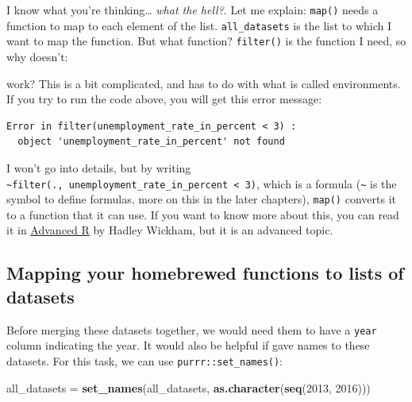 \documentclass[]{gitbook}
\newenvironment{Shaded}{\begin{snugshade}}{\end{snugshade}}
\newcommand{\DecValTok}[1]{\textcolor[rgb]{0.00,0.00,0.81}{#1}}
\newcommand{\KeywordTok}[1]{\textcolor[rgb]{0.13,0.29,0.53}{\textbf{#1}}}
\newcommand{\NormalTok}[1]{#1}
\newcommand{\OperatorTok}[1]{\textcolor[rgb]{0.81,0.36,0.00}{\textbf{#1}}}
\newcommand{\StringTok}[1]{\textcolor[rgb]{0.31,0.60,0.02}{#1}}
\theoremstyle{definition}
\theoremstyle{definition}
\theoremstyle{definition}
\theoremstyle{remark}
\begin{document}
I know what you're thinking\ldots{} \emph{what the hell?}. Let me
explain: \texttt{map()} needs a function to map to each element of the
list. \texttt{all\_datasets} is the list to which I want to map the
function. But what function? \texttt{filter()} is the function I need,
so why doesn't:

\begin{Shaded}
\end{Shaded}

work? This is a bit complicated, and has to do with what is called
environments. If you try to run the code above, you will get this error
message:

\begin{verbatim}
Error in filter(unemployment_rate_in_percent < 3) :
  object 'unemployment_rate_in_percent' not found
\end{verbatim}

I won't go into details, but by writing
\texttt{\textasciitilde{}filter(.,\ unemployment\_rate\_in\_percent\ \textless{}\ 3)},
which is a formula (\texttt{\textasciitilde{}} is the symbol to define
formulas, more on this in the later chapters), \texttt{map()} converts
it to a function that it can use. If you want to know more about this,
you can read it in
\href{http://adv-r.had.co.nz/Functional-programming.html\#closures}{Advanced
R} by Hadley Wickham, but it is an advanced topic.

\hypertarget{mapping-your-homebrewed-functions-to-lists-of-datasets}{%
\subsection{Mapping your homebrewed functions to lists of
datasets}\label{mapping-your-homebrewed-functions-to-lists-of-datasets}}

Before merging these datasets together, we would need them to have a
\texttt{year} column indicating the year. It would also be helpful if
gave names to these datasets. For this task, we can use
\texttt{purrr::set\_names()}:

\begin{Shaded}
\begin{Highlighting}[]
\NormalTok{all_datasets =}\StringTok{ }\KeywordTok{set_names}\NormalTok{(all_datasets, }\KeywordTok{as.character}\NormalTok{(}\KeywordTok{seq}\NormalTok{(}\DecValTok{2013}\NormalTok{, }\DecValTok{2016}\NormalTok{)))}
\end{Highlighting}
\end{Shaded}
\end{document}
